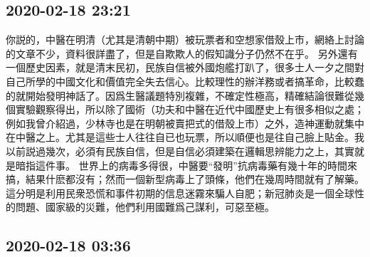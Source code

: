\documentclass[twocolumn]{ctexart}
\begin{document}
\subsection*{2020-02-18 23:21}

你説的，中醫在明清（尤其是清朝中期）被玩票者和空想家借殼上市，網絡上討論的文章不少，資料很詳盡了，但是自欺欺人的假知識分子仍然不在乎。
另外還有一個歷史因素，就是清末民初，民族自信被外國炮艦打趴了，很多士人一夕之間對自己所學的中國文化和價值完全失去信心。比較理性的辦洋務或者搞革命，比較蠢的就開始發明神話了。因爲生醫議題特別複雜，不確定性極高，精確結論很難從幾個實驗觀察得出，所以除了國術（功夫和中醫在近代中國歷史上有很多相似之處；例如我曾介紹過，少林寺也是在明朝被賣把式的借殼上市）之外，造神運動就集中在中醫之上。尤其是這些士人往往自已也玩票，所以順便也是往自己臉上貼金。我以前説過幾次，必須有民族自信，但是自信必須建築在邏輯思辨能力之上，其實就是暗指這件事。
世界上的病毒多得很，中醫要“發明”抗病毒藥有幾十年的時間來搞，結果什麽都沒有；然而一個新型病毒上了頭條，他們在幾周時間就有了解藥。這分明是利用民衆恐慌和事件初期的信息迷霧來騙人自肥；新冠肺炎是一個全球性的問題、國家級的災難，他們利用國難爲己謀利，可惡至極。
\subsection*{2020-02-18 03:36}
\end{document}
